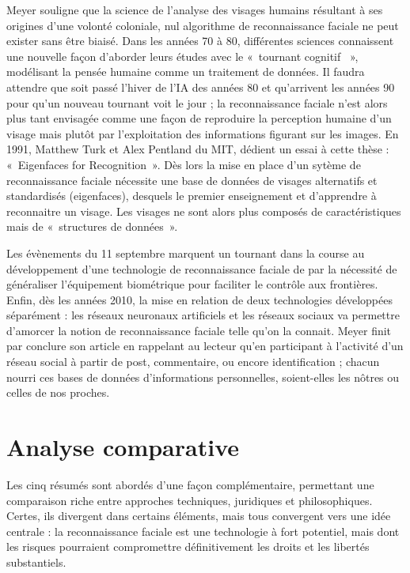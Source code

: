 \documentclass[11pt]{article}
\begin{document}
Meyer souligne que la science de l’analyse des visages humains résultant à ses origines d’une volonté coloniale, nul algorithme 
de reconnaissance faciale ne peut exister sans être biaisé.
Dans les années 70 à 80, différentes sciences connaissent une nouvelle façon d’aborder leurs études avec le « tournant cognitif 
», modélisant la pensée humaine comme un traitement de données. 
Il faudra attendre que soit passé l’hiver de l’IA des années 80 et qu’arrivent les années 90 pour qu’un nouveau tournant voit le 
jour ; la reconnaissance faciale n’est alors plus tant envisagée comme une façon de reproduire la perception humaine d’un visage 
mais plutôt par l’exploitation des informations figurant sur les images. En 1991, Matthew Turk et Alex Pentland du MIT, dédient 
un essai à cette thèse : « Eigenfaces for Recognition ».
Dès lors la mise en place d’un sytème de reconnaissance faciale nécessite une base de données de visages alternatifs et 
standardisés (eigenfaces), desquels le premier enseignement et d’apprendre à reconnaitre un visage. Les visages ne sont alors 
plus composés de caractéristiques mais de « structures de données ».

Les évènements du 11 septembre marquent un tournant dans la course au développement d’une technologie de reconnaissance faciale 
de par la nécessité de généraliser l’équipement biométrique pour faciliter le contrôle aux frontières.
Enfin, dès les années 2010, la mise en relation de deux technologies développées séparément : les réseaux neuronaux artificiels 
et les réseaux sociaux va permettre d’amorcer la notion de reconnaissance faciale telle qu’on la connait.
Meyer finit par conclure son article en rappelant au lecteur qu’en participant à l’activité d’un réseau social à partir de post, 
commentaire, ou encore identification ; chacun nourri ces bases de données d’informations personnelles, soient-elles les nôtres 
ou celles de nos proches.


\section{Analyse comparative}
Les cinq résumés sont abordés d’une façon complémentaire, permettant une comparaison riche entre approches techniques, 
juridiques et philosophiques. Certes, ils divergent dans certains éléments, mais tous convergent vers une idée centrale : la 
reconnaissance faciale est une technologie à fort potentiel, mais dont les risques pourraient compromettre définitivement les 
droits et les libertés substantiels.
\end{document}
